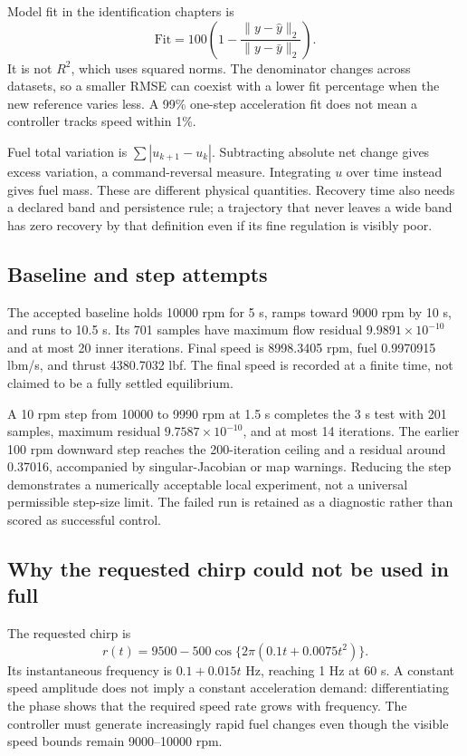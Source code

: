 Model fit in the identification chapters is
\begin{equation}\mathrm{Fit}=100\left(1-\frac{\|y-\hat y\|_2}{\|y-\bar y\|_2}\right).
\end{equation}
It is not $R^2$, which uses squared norms. The denominator changes across datasets, so a smaller RMSE can coexist with a lower fit percentage when the new reference varies less. A 99\% one-step acceleration fit does not mean a controller tracks speed within 1\%.

Fuel total variation is $\sum|u_{k+1}-u_k|$. Subtracting absolute net change gives excess variation, a command-reversal measure. Integrating $u$ over time instead gives fuel mass. These are different physical quantities. Recovery time also needs a declared band and persistence rule; a trajectory that never leaves a wide band has zero recovery by that definition even if its fine regulation is visibly poor.

\subsection{Baseline and step attempts}
The accepted baseline holds 10000 rpm for 5 s, ramps toward 9000 rpm by 10 s, and runs to 10.5 s. Its 701 samples have maximum flow residual $9.9891\times10^{-10}$ and at most 20 inner iterations. Final speed is 8998.3405 rpm, fuel 0.9970915 lbm/s, and thrust 4380.7032 lbf. The final speed is recorded at a finite time, not claimed to be a fully settled equilibrium.

A 10 rpm step from 10000 to 9990 rpm at 1.5 s completes the 3 s test with 201 samples, maximum residual $9.7587\times10^{-10}$, and at most 14 iterations. The earlier 100 rpm downward step reaches the 200-iteration ceiling and a residual around 0.37016, accompanied by singular-Jacobian or map warnings. Reducing the step demonstrates a numerically acceptable local experiment, not a universal permissible step-size limit. The failed run is retained as a diagnostic rather than scored as successful control.

\subsection{Why the requested chirp could not be used in full}
The requested chirp is
\begin{equation}r(t)=9500-500\cos\{2\pi(0.1t+0.0075t^2)\}.
\end{equation}
Its instantaneous frequency is $0.1+0.015t$ Hz, reaching 1 Hz at 60 s. A constant speed amplitude does not imply a constant acceleration demand: differentiating the phase shows that the required speed rate grows with frequency. The controller must generate increasingly rapid fuel changes even though the visible speed bounds remain 9000--10000 rpm.

